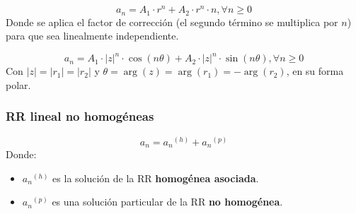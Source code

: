 \documentclass[11pt,a4paper]{article}   %
\begin{document}
\begin{tcolorbox}[colback=purple!5!white,colframe=purple!75!black,title=Caso 2: Raíces reales e iguales]
\[
a_n = A_1 \cdot {r}^n + A_2 \cdot {r}^n \cdot n, \forall n \geqslant 0
\]
Donde se aplica el factor de corrección (el segundo término se multiplica por $n$) para que sea linealmente independiente.
\end{tcolorbox}

\begin{tcolorbox}[colback=purple!5!white,colframe=purple!75!black,title=Caso 3: Raíces complejas conjugadas]
\[
a_n = A_1 \cdot |{z}|^n \cdot \cos (n\theta)  + A_2 \cdot |{z}|^n \cdot \sin (n\theta), \forall n \geqslant 0
\]
Con $|{z}| = |{r_1}| = |{r_2}|$ y $\theta = \arg(z) = \arg(r_1) = -\arg(r_2)$, en su forma polar.
\end{tcolorbox}


\subsubsection{RR lineal no homogéneas}
\begin{tcolorbox}[colback=purple!5!white,colframe=purple!75!black,title=Método de los coeficientes indeterminados]
\[
a_n = {a_n}^{(h)} + {a_n}^{(p)}
\]
Donde:
\begin{itemize}
    \item ${a_n}^{(h)}$ es la solución de la RR \textbf{homogénea asociada}.
    \item ${a_n}^{(p)}$ es una solución particular de la RR \textbf{no homogénea}.
\end{itemize}
\end{tcolorbox}
\end{document}
